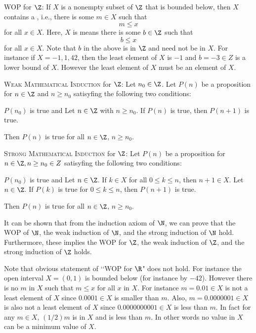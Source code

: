 \begin{enumerate}[nosep]
  \li WOP for $\Z$:
  If $X$ is a nonempty subset of $\Z$ that is bounded below, then $X$ contains a
  ,
  i.e., there is some $m \in X$ such that
  \[
  m \leq x
  \]
  for all $x \in X$.
  Here, $X$ is  means there is some $b \in \Z$ such that
  \[
  b \leq x
  \]
  for all $x \in X$.
  Note that $b$ in the above is in $\Z$ and need not be in $X$.
  For instance if $X = {-1, 1, 42}$, then the least element of $X$ is $-1$
  and $b = -3\in Z$ is a lower bound of $X$.
  However the least element of $X$ must be an element of $X$.
\end{enumerate}
\begin{enumerate}[nosep]
  \li \textsc{Weak Mathematical Induction} for $\Z$:
  Let $n_0 \in \Z$.
  Let $P(n)$ be a proposition for $n \in \Z$ and $n \geq n_0$
  satisyfing the following two conditions:
  \begin{enumerate}[nosep]
    \li $P(n_0)$ is true and
    \li Let $n \in \Z$ with $n \geq n_0$.
    If $P(n)$ is true, then $P(n+1)$ is true.
  \end{enumerate}
  Then $P(n)$ is true for all $n \in \Z$, $n \geq n_0$.
\end{enumerate}
\begin{enumerate}[nosep]
  \li \textsc{Strong Mathematical Induction} for $\Z$:
  Let $P(n)$ be a proposition for $n \in \Z, n \geq n_0 \in Z$
  satisyfing the following two
  conditions:
  \begin{enumerate}[nosep]
    \li $P(n_0)$ is true and
    \li Let $n \in \Z$. If $k \in X$ for all $0 \leq k \leq n$,
    then $n + 1 \in X$.
    \li Let $n \in \Z$. If $P(k)$ is true for $0 \leq k \leq n$,
    then $P(n+1)$ is true.
  \end{enumerate}
  Then $P(n)$ is true for all $n \in \Z$, $n \geq n_0$.
\end{enumerate}

It can be shown that from the induction axiom of $\N$,
we can prove that the WOP of $\N$, the weak induction of $\N$, and the
strong induction of $\N$ hold.
Furthermore, these implies the WOP for $\Z$, the weak induction of $\Z$,
and the strong induction of $\Z$ holds.

Note that
obvious statement of \lq\lq WOP for $\R$" does not hold.
For instance the open interval $X = (0, 1)$ is bounded below
(for instance by $-42$).
However there is no $m$ in $X$ such that $m \leq x$ for all $x$ in $X$.
For instance $m = 0.01 \in X$ is not a least element of $X$
since $0.0001 \in X$ is smaller than $m$.
Also, $m = 0.0000001 \in X$ is also not a least element of $X$ since
$0.0000000001 \in X$ is less than $m$.
In fact for any $m \in X$, $(1/2)m$ is in $X$ and is less than $m$.
In other words no value in $X$ can be a minimum value of $X$.

